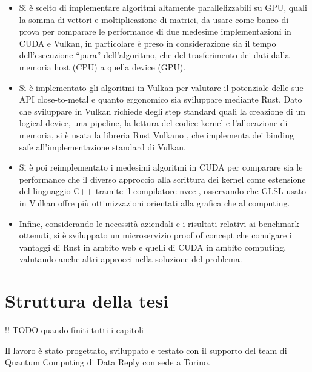 \begin{itemize}
    \item Si è scelto di implementare algoritmi altamente parallelizzabili su GPU, quali la somma di vettori e moltiplicazione di matrici, da usare come banco di prova per comparare le performance di due medesime implementazioni in CUDA e Vulkan, in particolare è preso in considerazione sia il tempo dell'esecuzione ``pura'' dell'algoritmo, che del trasferimento dei dati dalla memoria host (CPU) a quella device (GPU).
    \item Si è implementato gli algoritmi in Vulkan per valutare il potenziale delle sue API close-to-metal e quanto ergonomico sia sviluppare mediante Rust. Dato che sviluppare in Vulkan richiede degli step standard quali la creazione di un logical device, una pipeline, la lettura del codice kernel e l'allocazione di memoria, si è usata la libreria Rust Vulkano \cite[]{github:Vulkano}, che implementa dei binding safe all'implementazione standard di Vulkan.
    \item Si è poi reimplementato i medesimi algoritmi in CUDA per comparare sia le performance che il diverso approccio alla scrittura dei kernel come estensione del linguaggio C++ tramite il compilatore nvcc \cite[]{NVIDIA:nvcc}, osservando che GLSL \cite[]{KG:GLSL} usato in Vulkan offre più ottimizzazioni orientati alla grafica che al computing.
    \item Infine, considerando le necessità aziendali e i risultati relativi ai benchmark ottenuti, si è sviluppato un microservizio proof of concept che conuigare i vantaggi di Rust in ambito web e quelli di CUDA in ambito computing, valutando anche altri approcci nella soluzione del problema.
\end{itemize}



\section[Struttura della tesi]{Struttura della tesi}

!! TODO quando finiti tutti i capitoli

Il lavoro è stato progettato, sviluppato e testato con il supporto del team di Quantum Computing di Data Reply con sede a Torino. 

